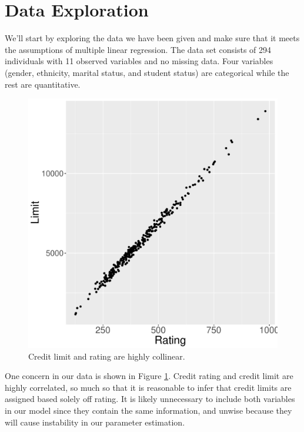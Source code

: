 \documentclass{article}
\begin{document}
\section{Data Exploration}
We'll start by exploring the data we have been given and make sure that it meets the assumptions of multiple linear regression. The data set consists of 294 individuals with 11 observed variables and no missing data. Four variables (gender, ethnicity, marital status, and student status) are categorical while the rest are quantitative.
\begin{figure}
\centering
\includegraphics[scale=.3]{limitRating.pdf}
\caption{Credit limit and rating are highly collinear. }
\label{lr}
\end{figure}

One concern in our data is shown in Figure \ref{lr}. Credit rating and credit limit are highly correlated, so much so that it is reasonable to infer that credit limits are assigned based solely off rating. It is likely unnecessary to include both variables in our model since they contain the same information, and unwise because they will cause instability in our parameter estimation.
\end{document}
